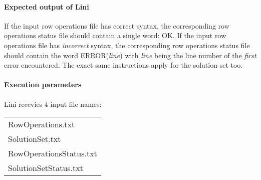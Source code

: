 \documentclass{article}
\begin{document}
\paragraph{Expected output of Lini}
If the input row operations file has correct syntax,
the corresponding row operations status file should contain a single word: OK.
If the input row operations file has \textit{incorrect} syntax,
the corresponding row operations status file should contain the word ERROR(\textit{line})
with \textit{line} being the line number of the \textit{first} error encountered.
The exact same instructions apply for the solution set too.


\paragraph{Execution parameters}
Lini recevies $4$ input file names:
\begin{table}[h]
\centering
\begin{tabular}{ l }
  RowOperations.txt       \\
  SolutionSet.txt         \\
  RowOperationsStatus.txt \\
  SolutionSetStatus.txt   \\
\end{tabular}
\end{table}
\end{document}
